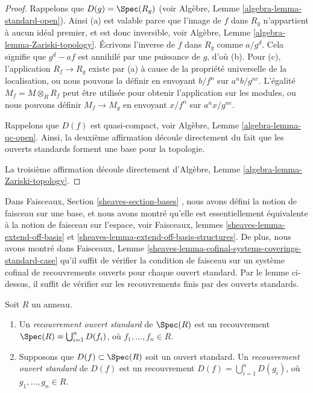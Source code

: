 \begin{proof}
Rappelons que  $D(g) = \Spec(R_g)$  (voir Algèbre, Lemme  \ref{algebra-lemma-standard-open}). Ainsi (a) est
valable parce que l'image de  $f$  dans  $R_g$  n'appartient
à aucun idéal premier, et est donc inversible, voir Algèbre, Lemme
 \ref{algebra-lemma-Zariski-topology}. Écrivons l’inverse de  $f$  dans  $R_g$  comme
 $a/g^d$. Cela signifie que  $g^d - af$  est annihilé par une puissance de
 $g$, d’où (b). Pour (c), l’application  $R_f \to R_g$  existe par (a) à
cause de la propriété universelle de la localisation, ou nous pouvons la définir
en envoyant  $b/f^n$  sur  $a^nb/g^{ne}$. L’égalité  $M_f = M \otimes_R R_f$  peut être utilisée
pour obtenir l’application sur les modules, ou nous pouvons définir  $M_f \to M_g$ 
en envoyant  $x/f^n$  sur  $a^nx/g^{ne}$.

\medskip\noindent
Rappelons que  $D(f)$  est quasi-compact, voir Algèbre, Lemme
 \ref{algebra-lemma-qc-open}. Ainsi, la deuxième affirmation découle directement du fait que les
ouverts standards forment une base pour la topologie.

\medskip\noindent
La troisième affirmation découle directement d'Algèbre, Lemme  \ref{algebra-lemma-Zariski-topology}.
\end{proof}

\noindent
Dans Faisceaux, Section  \ref{sheaves-section-bases} , nous avons défini la notion de faisceau sur
une base, et nous avons montré qu'elle est essentiellement équivalente à la notion
de faisceau sur l'espace, voir Faisceaux, lemmes  \ref{sheaves-lemma-extend-off-basis}  et  \ref{sheaves-lemma-extend-off-basis-structures}. De
plus, nous avons montré dans Faisceaux, Lemme  \ref{sheaves-lemma-cofinal-systems-coverings-standard-case}  qu'il suffit de
vérifier la condition de faisceau sur un système cofinal de recouvrements ouverts
pour chaque ouvert standard. Par le lemme ci-dessus, il suffit de vérifier sur les
recouvrements finis par des ouverts standards.

\begin{definition}
\label{definition-standard-covering}
Soit  $R$  un anneau.
\begin{enumerate}
\item Un  {\it  recouvrement ouvert standard}  de
 $\Spec(R)$  est un recouvrement  $\Spec(R) = \bigcup_{i = 1}^n D(f_i)$, où  $f_1, \ldots, f_n \in R$.
\item Supposons que  $D(f) \subset \Spec(R)$  soit un ouvert standard. Un
 {\it  recouvrement ouvert standard}  de  $D(f)$  est un recouvrement
 $D(f) = \bigcup_{i = 1}^n D(g_i)$, où  $g_1, \ldots, g_n \in R$.
\end{enumerate}
\end{definition}

